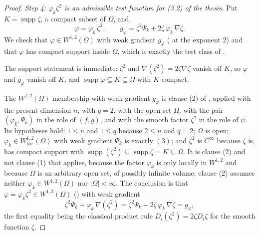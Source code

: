\begin{proof}
\emph{Step 4: $\varphi_k\zeta^2$ is an admissible test function for
(3.2) of the thesis.}  Put $K=\operatorname{supp}\zeta$, a compact subset of
$\Omega$, and
\[
\varphi=\varphi_k\,\zeta^2,
\qquad
g_\varphi=\zeta^2\Psi_k+2\zeta\,\varphi_k\,\nabla\zeta .
\]
We check that $\varphi\in W^{1,2}(\Omega)$ with weak gradient $g_\varphi$
( at the exponent $2$) and that $\varphi$ has compact support
inside $\Omega$, which is exactly the test class of
.

The support statement is immediate: $\zeta^2$ and
$\nabla(\zeta^2)=2\zeta\nabla\zeta$ vanish off $K$, so $\varphi$ and
$g_\varphi$ vanish off $K$, and $\operatorname{supp}\varphi\subseteq K\subseteq\Omega$
with $K$ compact.

The $W^{1,2}(\Omega)$ membership with weak gradient $g_\varphi$ is clause (2) of
, applied with the present dimension $n$, with
$q=2$, with the open set $\Omega$, with the pair $(\varphi_k,\Psi_k)$ in the
role of $(f,g)$, and with the smooth factor $\zeta^2$ in the role of $\psi$.
Its hypotheses hold: $1\le n$ and $1\le q$ because $2\le n$ and $q=2$;
$\Omega$ is open; $\varphi_k\in W^{1,2}_{\mathrm{loc}}(\Omega)$ with weak
gradient $\Psi_k$ is exactly $(3)$; and $\zeta^2$ is $C^\infty$ because $\zeta$
is, has compact support with
$\operatorname{supp}(\zeta^2)\subseteq\operatorname{supp}\zeta=K\subseteq\Omega$.
It is clause (2) and not clause (1) that applies, because the factor $\varphi_k$
is only locally in $W^{1,2}$ and because $\Omega$ is an arbitrary open set, of
possibly infinite volume; clause (2) assumes neither $\varphi_k\in
W^{1,2}(\Omega)$ nor $|\Omega|<\infty$.  The conclusion is that
$\varphi=\varphi_k\zeta^2\in W^{1,2}(\Omega)$ () with weak
gradient
\[
\zeta^2\Psi_k+\varphi_k\,\nabla(\zeta^2)
=\zeta^2\Psi_k+2\zeta\,\varphi_k\,\nabla\zeta
=g_\varphi ,
\]
the first equality being the classical product rule $D_i(\zeta^2)=2\zeta D_i\zeta$
for the smooth function $\zeta$.


\end{proof}
